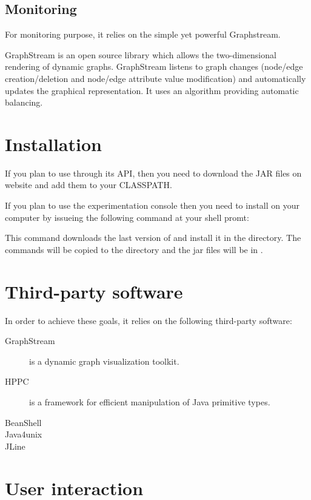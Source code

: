 \documentclass{article}
\begin{document}
\subsection{Monitoring}

For monitoring purpose,
it relies on the simple yet powerful Graphstream.

		GraphStream is an open source  library which allows
		the two-dimensional rendering of dynamic graphs.
		GraphStream listens to graph changes
		(node/edge creation/deletion and node/edge attribute value modification)
		and automatically updates the graphical representation. It uses
		an algorithm providing automatic balancing.
		
		
		
		

		
\section{Installation}

If you plan to use \grph through its API, then you need to download the JAR files on \grph website and add them to your CLASSPATH.

If you plan to use the experimentation console then you need to install \grph on your computer by issueing the following command at your
shell promt:

This command downloads the last version of \grph and install it in the  directory.
The commands will be copied to the directory  and the jar files will be in
.

\section{Third-party software}
In order to achieve these goals, it relies on the following third-party software:
\begin{description}
  \item[GraphStream] is a dynamic graph visualization toolkit. 
  \item[HPPC] is a framework for efficient manipulation of Java primitive types.
  \item[BeanShell]
   \item[Java4unix] 
  \item[JLine] 
\end{description}


\section{User interaction}
\end{document}
